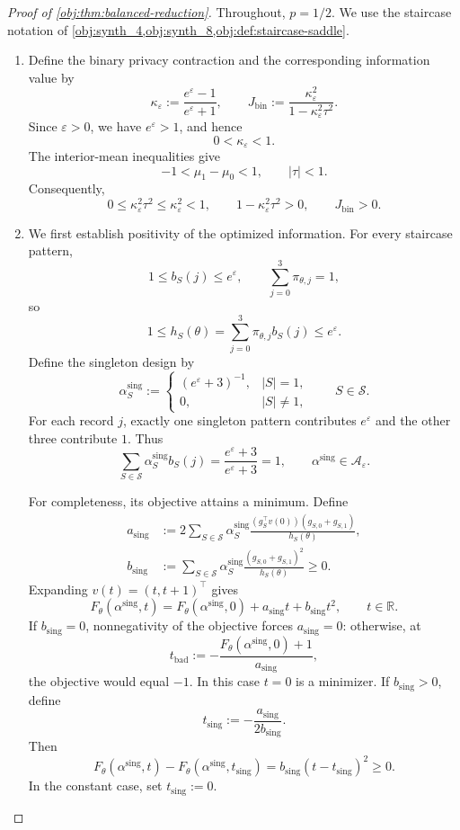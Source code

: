 \begin{proof}[Proof of \cref{obj:thm:balanced-reduction}]
Throughout, \(p=1/2\). We use the staircase notation of \cref{obj:synth_4,obj:synth_8,obj:def:staircase-saddle}.

\begin{enumerate}
\item Define the binary privacy contraction and the corresponding information value by
\[
\kappa_\varepsilon
:=\frac{e^\varepsilon-1}{e^\varepsilon+1},
\qquad
J_{\mathrm{bin}}
:=\frac{\kappa_\varepsilon^2}
{1-\kappa_\varepsilon^2\tau^2}.
\]
Since \(\varepsilon>0\), we have \(e^\varepsilon>1\), and hence
\[
0<\kappa_\varepsilon<1.
\]
The interior-mean inequalities give
\[
-1<\mu_1-\mu_0<1,
\qquad |\tau|<1.
\]
Consequently,
\[
0\le \kappa_\varepsilon^2\tau^2
\le \kappa_\varepsilon^2<1,
\qquad
1-\kappa_\varepsilon^2\tau^2>0,
\qquad
J_{\mathrm{bin}}>0.
\]

\item We first establish positivity of the optimized information. For every staircase pattern,
\[
1\le b_S(j)\le e^\varepsilon,
\qquad
\sum_{j=0}^3\pi_{\theta,j}=1,
\]
so
\[
1\le h_S(\theta)
=\sum_{j=0}^3\pi_{\theta,j}b_S(j)
\le e^\varepsilon.
\]
Define the singleton design by
\[
\alpha^{\mathrm{sing}}_S
:=
\begin{cases}
(e^\varepsilon+3)^{-1},& |S|=1,\\
0,& |S|\ne1,
\end{cases}
\qquad S\in\mathcal S.
\]
For each record \(j\), exactly one singleton pattern contributes
\(e^\varepsilon\) and the other three contribute \(1\). Thus
\[
\sum_{S\in\mathcal S}
\alpha^{\mathrm{sing}}_S b_S(j)
=\frac{e^\varepsilon+3}{e^\varepsilon+3}=1,
\qquad
\alpha^{\mathrm{sing}}\in\mathcal A_\varepsilon.
\]

For completeness, its objective attains a minimum. Define
\[
\begin{aligned}
a_{\mathrm{sing}}
&:=2\sum_{S\in\mathcal S}
\alpha^{\mathrm{sing}}_S
\frac{(g_S^\top v(0))(g_{S,0}+g_{S,1})}
{h_S(\theta)},\\
b_{\mathrm{sing}}
&:=\sum_{S\in\mathcal S}
\alpha^{\mathrm{sing}}_S
\frac{(g_{S,0}+g_{S,1})^2}{h_S(\theta)}
\ge0.
\end{aligned}
\]
Expanding \(v(t)=(t,t+1)^\top\) gives
\[
F_\theta(\alpha^{\mathrm{sing}},t)
=
F_\theta(\alpha^{\mathrm{sing}},0)
+a_{\mathrm{sing}}t+b_{\mathrm{sing}}t^2,
\qquad t\in\mathbb R.
\]
If \(b_{\mathrm{sing}}=0\), nonnegativity of the objective forces
\(a_{\mathrm{sing}}=0\): otherwise, at
\[
t_{\mathrm{bad}}
:=-\frac{F_\theta(\alpha^{\mathrm{sing}},0)+1}
{a_{\mathrm{sing}}},
\]
the objective would equal \(-1\). In this case \(t=0\) is a minimizer.
If \(b_{\mathrm{sing}}>0\), define
\[
t_{\mathrm{sing}}
:=-\frac{a_{\mathrm{sing}}}{2b_{\mathrm{sing}}}.
\]
Then
\[
F_\theta(\alpha^{\mathrm{sing}},t)
-F_\theta(\alpha^{\mathrm{sing}},t_{\mathrm{sing}})
=b_{\mathrm{sing}}(t-t_{\mathrm{sing}})^2\ge0.
\]
In the constant case, set \(t_{\mathrm{sing}}:=0\).


\end{enumerate}
\end{proof}
